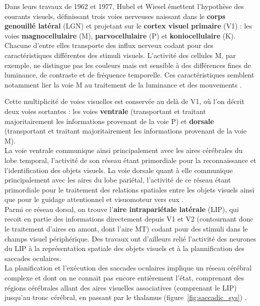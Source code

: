 Dans leurs travaux de 1962 et 1977, Hubel et Wiesel émettent l'hypothèse des courants visuels, définissant trois voies nerveuses naissant dans le \textbf{corps genouillé latéral} (LGN) et projetant sur le \textbf{cortex visuel primaire} (V1) :  les voies \textbf{magnocellulaire} (M),  \textbf{parvocellulaire} (P) et  \textbf{koniocellulaire} (K). Chacune d'entre elles transporte des influx nerveux codant pour des caractéristiques différentes des stimuli visuels.
L'activité des cellules M, par exemple, ne distingue pas les couleurs mais est sensible à des différences fines de luminance, de contraste et de fréquence temporelle. Ces caractéristiques semblent notamment lier la voie M au traitement de la luminance et des mouvements \autocite{Denison2014, Werner2014}.

Cette multiplicité de voies visuelles est conservée au delà de V1, où l'on décrit deux voies sortantes : les voies \textbf{ventrale} (transportant et traitant majoritairement les informations provenant de la voie P) et \textbf{dorsale} (transportant et traitant majoritairement les informations provenant de la voie M)\autocite{Werner2014, Freeman2011, Goodale2004}.\\
La voie ventrale communique ainsi principalement avec les aires cérébrales du lobe temporal, l'activité de son réseau étant primordiale pour la reconnaissance et l'identification des objets visuels. La voie dorsale quant à elle communique principalement avec les aires du lobe pariétal, l'activité de ce réseau étant primordiale pour le traitement des relations spatiales entre les objets visuels ainsi que pour le guidage attentionnel et visuomoteur vers eux \autocite{Werner2014, Freeman2011, Goodale2004}.\\
Parmi ce réseau dorsal, on trouve l'\textbf{aire intrapariétale latérale} (LIP), qui recoit en partie des informations directement depuis V1 et V2 (contournant donc le traitement d'aires en amont, dont l'aire MT) codant pour des stimuli dans le champs visuel périphérique. Des travaux ont d'ailleurs relié l'activité des neurones du LIP à la représentation spatiale des objets visuels et à la plannification des saccades oculaires\autocite{Werner2014}.\\
La planification et l'exécution des saccades oculaires implique un réseau cérébral complexe et dont on ne connait pas encore entièrement l'état, comprenant des régions cérébrales allant des aires visuelles associatives (comprenant le LIP) jusqu'au tronc cérébral, en passant par le thalamus (figure~\ref{fig:saccadic_sys}) \autocite{Zhaoping2014}.

